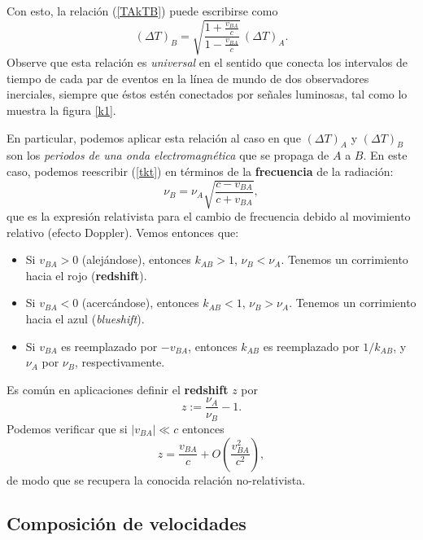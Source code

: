 Con esto, la relación (\ref{TAkTB}) puede escribirse como
\begin{equation}
(\Delta T)_B=\sqrt{\frac{1+\frac{v_{BA}}{c}}{1-\frac{v_{BA}}{c}}}
\,(\Delta T)_A. \label{k2}
\end{equation}
Observe que esta relación es \textit{universal} en el sentido que conecta los intervalos de tiempo de cada par de eventos en la línea de mundo de dos observadores inerciales, siempre que éstos estén conectados por se\~nales luminosas, tal como lo muestra la figura \ref{k1}.

En particular, podemos aplicar esta relación al caso en que $(\Delta T)_A$ y
$(\Delta T)_B$ son los \textit{periodos de una onda electromagnética} que se propaga de $A$ a $B$. En este caso, podemos reescribir (\ref{tkt}) en términos de la \textbf{frecuencia} de la radiación:
\begin{equation}
\nu_B=\nu_A\sqrt{\frac{c-v_{BA}}{c+v_{BA}}},
\end{equation}
que es la expresión relativista para el cambio de frecuencia debido al movimiento relativo (efecto Doppler). Vemos entonces que:
\begin{itemize}
\item Si $v_{BA}>0$ (alejándose), entonces $k_{AB}>1$, $\nu_B <
\nu_A$.
Tenemos un corrimiento hacia el rojo (\textbf{redshift}).
\item Si $v_{BA}<0$ (acercándose), entonces $k_{AB}<1$, $\nu_B >
\nu_A$.
Tenemos un corrimiento hacia el azul (\textit{blueshift}).
\item Si $v_{BA}$ es reemplazado por $-v_{BA}$, entonces $k_{AB}$ es reemplazado
por $1/{k_{AB}}$, y $\nu_A$ por $\nu_B$, respectivamente.
\end{itemize}
Es común en aplicaciones definir el \textbf{redshift} $z$ por
\begin{equation}
z:=\frac{\nu_A}{\nu_B}-1.
\end{equation}
Podemos verificar que si $|v_{BA}|\ll c$ entonces 
\begin{equation}
z=\frac{v_{BA}}{c}+O(\frac{v_{BA}^2}{c^2}),
\end{equation}
de modo que se recupera la conocida relación no-relativista.

\subsection{Composición de velocidades}

